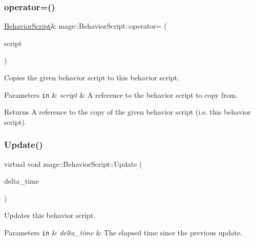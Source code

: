 \subsubsection{\texorpdfstring{operator=()}{operator=()}\hspace{0.1cm}{\footnotesize\ttfamily [2/2]}}
{\footnotesize\ttfamily \hyperlink{classmage_1_1_behavior_script}{Behavior\+Script}\& mage\+::\+Behavior\+Script\+::operator= (\begin{DoxyParamCaption}\item[{\hyperlink{classmage_1_1_behavior_script}{Behavior\+Script} \&\&}]{script }\end{DoxyParamCaption})\hspace{0.3cm}{\ttfamily [delete]}}

Copies the given behavior script to this behavior script.


\begin{DoxyParams}[1]{Parameters}
\mbox{\tt in}  & {\em script} & A reference to the behavior script to copy from. \\
\hline
\end{DoxyParams}
\begin{DoxyReturn}{Returns}
A reference to the copy of the given behavior script (i.\+e. this behavior script). 
\end{DoxyReturn}
\hypertarget{classmage_1_1_behavior_script_a905b6c83640cb91d19fecab3435f6feb}{}\label{classmage_1_1_behavior_script_a905b6c83640cb91d19fecab3435f6feb} 
\subsubsection{\texorpdfstring{Update()}{Update()}}
{\footnotesize\ttfamily virtual void mage\+::\+Behavior\+Script\+::\+Update (\begin{DoxyParamCaption}\item[{double}]{delta\+\_\+time }\end{DoxyParamCaption})\hspace{0.3cm}{\ttfamily [pure virtual]}}

Updates this behavior script.


\begin{DoxyParams}[1]{Parameters}
\mbox{\tt in}  & {\em delta\+\_\+time} & The elapsed time since the previous update. \\
\hline
\end{DoxyParams}


